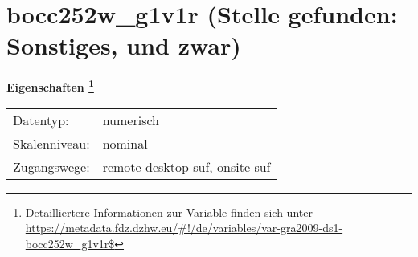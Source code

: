 
    \setcounter{footnote}{0}

    \vspace*{-1.8cm}
	\section{bocc252w\_g1v1r (Stelle gefunden: Sonstiges, und zwar)}
	\label{section:bocc252w_g1v1r}



    \vspace*{0.5cm}
    \noindent\textbf{Eigenschaften
	\footnote{Detailliertere Informationen zur Variable finden sich unter
		\url{https://metadata.fdz.dzhw.eu/\#!/de/variables/var-gra2009-ds1-bocc252w_g1v1r$}}}\\
	\begin{tabularx}{\hsize}{@{}lX}
	Datentyp: & numerisch \\
	Skalenniveau: & nominal \\
	Zugangswege: &
	  remote-desktop-suf, 
	  onsite-suf
 \\
    \end{tabularx}



